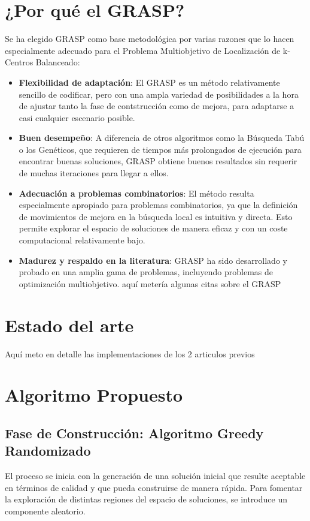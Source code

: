 \documentclass[12pt,a4paper]{book}
\begin{document}
\section{¿Por qué el GRASP?}
Se ha elegido GRASP como base metodológica por varias razones que lo hacen especialmente adecuado para el Problema Multiobjetivo de Localización de k-Centros Balanceado:
\begin{itemize}
    \item \textbf{Flexibilidad de adaptación}: El GRASP es un método relativamente sencillo de codificar, pero con una ampla variedad de posibilidades
    a la hora de ajustar tanto la fase de contstrucción como de mejora, para adaptarse a casi cualquier escenario posible. 
    \item \textbf{Buen desempeño}: A diferencia de otros algoritmos como la Búsqueda Tabú o los Genéticos, que requieren de tiempos más prolongados de ejecución para encontrar buenas soluciones,
    GRASP obtiene buenos resultados sin requerir de muchas iteraciones para llegar a ellos.
    \item \textbf{Adecuación a problemas combinatorios}: El método resulta especialmente apropiado para problemas combinatorios, ya que la definición de movimientos de mejora en la búsqueda local es intuitiva y directa.
    Esto permite explorar el espacio de soluciones de manera eficaz y con un coste computacional relativamente bajo.
    \item \textbf{Madurez y respaldo en la literatura}: GRASP ha sido desarrollado y probado en una amplia gama de problemas, incluyendo problemas de optimización multiobjetivo. \color{red} aquí metería algunas citas sobre el GRASP\color{black}
\end{itemize}

\section{Estado del arte}
Aquí meto en detalle las implementaciones de los 2 articulos previos

\section{Algoritmo Propuesto}

\subsection{Fase de Construcción: Algoritmo Greedy Randomizado}
El proceso se inicia con la generación de una solución inicial que resulte aceptable en términos de calidad y que pueda construirse de manera rápida. Para fomentar la exploración de distintas regiones del espacio de soluciones, se introduce un componente aleatorio.  
\end{document}
